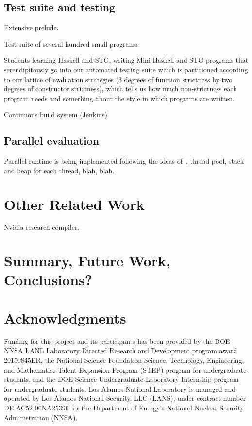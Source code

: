 \documentclass{llncs}
\begin{document}
\subsection{Test suite and testing}

Extensive prelude.

Test suite of several hundred small programs.

Students learning Haskell and STG, writing Mini-Haskell and STG programs that
serendipitously go into our automated testing suite which is partitioned
according to our lattice of evaluation strategies (3 degrees of function
strictness by two degrees of constructor strictness), which tells us how much
non-strictness each program needs and something about the style in which
programs are written.

Continuous build system (Jenkins)


\subsection{Parallel evaluation}

Parallel runtime is being implemented following the ideas
of~\cite{SPJs-many-papers}, thread pool, stack and heap for each thread, blah,
blah.

\section{Other Related Work}
Nvidia research compiler.

\section{Summary, Future Work, Conclusions?}

\section{Acknowledgments}

Funding for this project and its participants has been provided by the DOE
NNSA LANL Laboratory Directed Research and Development program award
20150845ER, the National Science Foundation Science, Technology, Engineering,
and Mathematics Talent Expansion Program (STEP) program for undergraduate
students, and the DOE Science Undergraduate Laboratory Internship program for
undergraduate students.
Los Alamos National Laboratory is managed and operated by Los Alamos National
Security, LLC (LANS), under contract number DE-AC52-06NA25396 for the
Department of Energy’s National Nuclear Security Administration (NNSA).

\cite{ghc-as-library}
\cite{Heren02}

%
%




\end{document}
